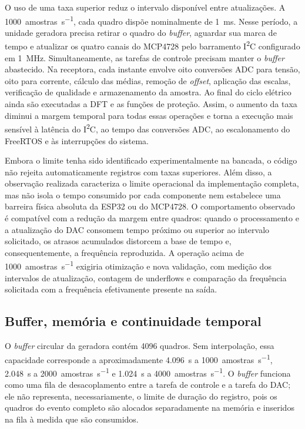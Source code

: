 O uso de uma taxa superior reduz o intervalo disponível entre atualizações. A \SI{1000}{amostras\per\second}, cada quadro dispõe nominalmente de \SI{1}{\milli\second}. Nesse período, a unidade geradora precisa retirar o quadro do \textit{buffer}, aguardar sua marca de tempo e atualizar os quatro canais do MCP4728 pelo barramento I\textsuperscript{2}C configurado em \SI{1}{\mega\hertz}. Simultaneamente, as tarefas de controle precisam manter o \textit{buffer} abastecido. Na receptora, cada instante envolve oito conversões ADC para tensão, oito para corrente, cálculo das médias, remoção de \textit{offset}, aplicação das escalas, verificação de qualidade e armazenamento da amostra. Ao final do ciclo elétrico ainda são executadas a DFT e as funções de proteção. Assim, o aumento da taxa diminui a margem temporal para todas essas operações e torna a execução mais sensível à latência do I\textsuperscript{2}C, ao tempo das conversões ADC, ao escalonamento do FreeRTOS e às interrupções do sistema.

Embora o limite tenha sido identificado experimentalmente na bancada, o código não rejeita automaticamente registros com taxas superiores. Além disso, a observação realizada caracteriza o limite operacional da implementação completa, mas não isola o tempo consumido por cada componente nem estabelece uma barreira física absoluta da ESP32 ou do MCP4728. O comportamento observado é compatível com a redução da margem entre quadros: quando o processamento e a atualização do DAC consomem tempo próximo ou superior ao intervalo solicitado, os atrasos acumulados distorcem a base de tempo e, consequentemente, a frequência reproduzida. A operação acima de \SI{1000}{amostras\per\second} exigiria otimização e nova validação, com medição dos intervalos de atualização, contagem de underflows e comparação da frequência solicitada com a frequência efetivamente presente na saída.

\subsection{Buffer, memória e continuidade temporal}

O \textit{buffer} circular da geradora contém 4096 quadros. Sem interpolação, essa capacidade corresponde a aproximadamente \SI{4,096}{\second} a \SI{1000}{amostras\per\second}, \SI{2,048}{\second} a \SI{2000}{amostras\per\second} e \SI{1,024}{\second} a \SI{4000}{amostras\per\second}. O \textit{buffer} funciona como uma fila de desacoplamento entre a tarefa de controle e a tarefa do DAC; ele não representa, necessariamente, o limite de duração do registro, pois os quadros do evento completo são alocados separadamente na memória e inseridos na fila à medida que são consumidos.


